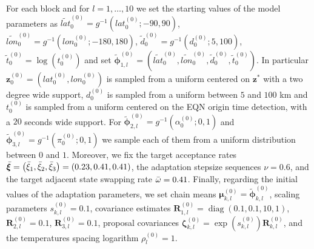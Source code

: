 \documentclass[final]{statsoc}
\DeclareMathOperator{\diag}{diag}
\begin{document}
\begin{appendix}
    For each block and for $l=1,\dots,10$ we set the starting values of the model parameters as $\widetilde{lat}_{0}^{(0)} = g^{-1}\left(lat_{0}^{(0)};-90,90\right)$, $\widetilde{lon}_{0}^{(0)} = g^{-1}\left(lon_{0}^{(0)};-180,180\right)$, $\tilde{d}_{0}^{(0)} = g^{-1}\left(d_{0}^{(0)};5,100\right)$, $\tilde{t}_{0}^{(0)} = \log{\left(t_{0}^{(0)}\right)}$ and set $\widetilde{\bm{\phi}}_{1,l}^{(0)} = \left(\widetilde{lat}_{0}^{(0)},\widetilde{lon}_{0}^{(0)}, \tilde{d}_{0}^{(0)},\tilde{t}_{0}^{(0)}\right)$. In particular $\mathbf{z}_{0}^{(0)}=\left(lat_{0}^{(0)},lon_{0}^{(0)}\right)$ is sampled from a uniform centered on $\mathbf{z}^{\ast}$ with a two degree wide support, $d_{0}^{(0)}$ is sampled from a uniform between $5$ and $100$ km and $t_{0}^{(0)}$ is sampled from a uniform centered on the EQN origin time detection, with a $20$ seconds wide support. For $\widetilde{\bm{\phi}}_{2,l}^{(0)} = g^{-1}\left(\alpha_{0}^{(0)};0,1\right)$ and $\widetilde{\bm{\phi}}_{3,l}^{(0)} = g^{-1}\left(\pi_{0}^{(0)};0,1\right)$ we sample each of them from a uniform distribution between $0$ and $1$.
%
    Moreover, we fix the target acceptance rates $\Bar{\bm{\xi}} = \left(\Bar{\xi}_{1},\Bar{\xi}_{2},\Bar{\xi}_{3}\right) = (0.23,0.41,0.41)$, the adaptation stepsize sequences $\nu = 0.6$, and the target adjacent state swapping rate $\Bar{\omega} = 0.41$.
    Finally, regarding the initial values of the adaptation parameters, we set %
    chain means $\bm{\mu}_{k,l}^{(0)} = \widetilde{\bm{\phi}}_{k,l}^{(0)}$, scaling parameters $s_{k,l}^{(0)} = 0.1$, covariance estimates $\mathbf{R}_{1,l}^{(0)}= \diag(0.1,0.1,10,1)$, $\mathbf{R}_{2,l}^{(0)} = 0.1$, $\mathbf{R}_{3,l}^{(0)} = 0.1$, proposal covariances $\bm{\zeta}_{k,l}^{(0)} = \exp{\left(s_{k,l}^{(0)}\right)} \mathbf{R}_{k,l}^{(0)}$, and the temperatures spacing logarithm $\rho_{l}^{(0)} = 1$.


\end{appendix}
\end{document}
